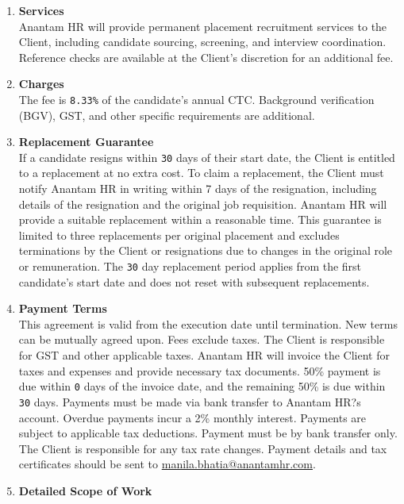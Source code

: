 \documentclass{article}
\begin{document}
\begin{enumerate}[label=\arabic{enumi}.]
    \item \textbf{Services}\\
        Anantam HR will provide permanent placement recruitment services to the Client, including candidate sourcing, screening, and interview coordination. Reference checks are available at the Client's discretion for an additional fee.
    \item \textbf{Charges}\\
        The fee is \texttt{8.33\%} of the candidate's annual CTC. Background verification (BGV), GST, and other specific requirements are additional.
    \item \textbf{Replacement Guarantee}\\
        If a candidate resigns within \texttt{30} days of their start date, the Client is entitled to a replacement at no extra cost. To claim a replacement, the Client must notify Anantam HR in writing within 7 days of the resignation, including details of the resignation and the original job requisition. Anantam HR will provide a suitable replacement within a reasonable time. This guarantee is limited to three replacements per original placement and excludes terminations by the Client or resignations due to changes in the original role or remuneration. The \texttt{30} day replacement period applies from the first candidate's start date and does not reset with subsequent replacements.
    \item \textbf{Payment Terms}\\
        This agreement is valid from the execution date until termination. New terms can be mutually agreed upon. Fees exclude taxes. The Client is responsible for GST and other applicable taxes. Anantam HR will invoice the Client for taxes and expenses and provide necessary tax documents. 50\% payment is due within \texttt{0} days of the invoice date, and the remaining 50\% is due within \texttt{30} days. Payments must be made via bank transfer to Anantam HR?s account. Overdue payments incur a 2\% monthly interest. Payments are subject to applicable tax deductions. Payment must be by bank transfer only. The Client is responsible for any tax rate changes. Payment details and tax certificates should be sent to \href{mailto:[manila.bhatia@anantamhr.com]}{manila.bhatia@anantamhr.com}.
    \item \textbf{Detailed Scope of Work}\\

\end{enumerate}
\end{document}
